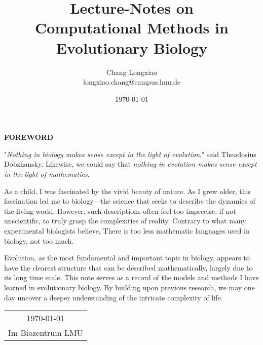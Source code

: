 \title{{\Huge Lecture-Notes on \\ \textbf{
Computational Methods in Evolutionary Biology}}}
\author{Chang Longxiao\\
longxiao.chang@campus.lmu.de}
\date{\today}

\maketitle                   %

\thispagestyle{empty}        %
\begin{center}
    \Huge\textbf{FOREWORD}
\end{center}

"\textit{Nothing in biology makes sense except in the light of evolution}," said Theodosius Dobzhansky. Likewise, we could say that \textit{nothing in evolution makes sense except in the light of mathematics}.

As a child, I was fascinated by the vivid beauty of nature. As I grew older, this fascination led me to biology—the science that seeks to describe the dynamics of the living world. However, such descriptions often feel too imprecise, if not unscientific, to truly grasp the complexities of reality. Contrary to what many experimental biologists believe, There is too less mathematic languages used in biology, not too much.

Evolution, as the most fundamental and important topic in biology, appears to have the clearest structure that can be described mathematically, largely due to its long time scale. This note serves as a record of the models and methods I have learned in evolutionary biology. By building upon previous research, we may one day uncover a deeper understanding of the intricate complexity of life.

\begin{flushright}
    \begin{tabular}{c}
        \today \\ 
        Im Biozentrum LMU
    \end{tabular}
\end{flushright}

\iffalse
\begin{center}
    If people do not believe that mathematics is simple,

    it is only because they do not realize how complicated life is. 
    
    ——John von Neumann
\end{center}
\fi

\newpage                   
\pagestyle{plain}             
\setcounter{page}{1}          

\tableofcontents              

\newpage                   
\pagestyle{plain}
\setcounter{page}{1}          
